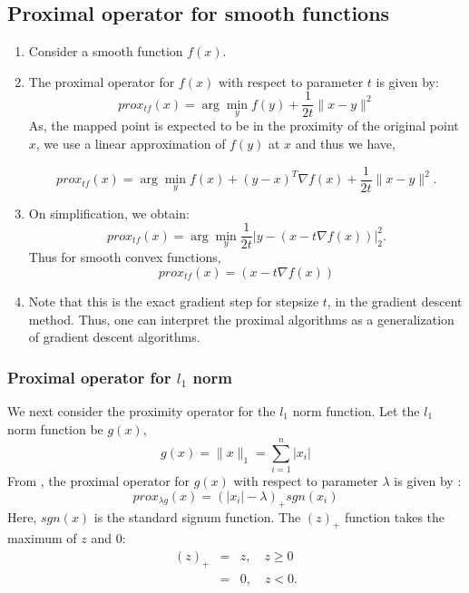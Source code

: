 \subsection{Proximal operator for smooth functions}


\begin{enumerate}
\item Consider a smooth function $f(x)$.
\item The proximal operator for $f(x)$ with respect to parameter $t$ is given by:
\begin{equation}
 prox_{t f}(x) = \arg \min_y  f(y) + \frac{1}{2t} \|x-y\|^2 
\end{equation}
As, the mapped point is expected to be in the proximity of the original point $x$, we use a linear approximation of $f(y)$ at $x$  and thus we have,

\begin{equation}
 prox_{t f}(x) = \arg \min_y f(x) + (y-x)^T \nabla f(x)  + \frac{1}{2t} \|x-y\|^2 .
\end{equation}
\item On simplification, we obtain:
\begin{equation}
 prox_{t f}(x) = \arg \min_y \frac{1}{2t} \left| y -  \left( x - t \nabla f(x) \right)  \right|^2_2.
\end{equation}
Thus for smooth convex functions, 
\begin{equation}
 prox_{t f}(x) = \left( x - t \nabla f(x) \right)
 \label{eq:prox}
\end{equation}
\item Note that this is the exact gradient step for stepsize $t$, in the gradient descent method.
Thus, one can interpret the proximal algorithms as a generalization of gradient descent algorithms.
\end{enumerate}

\subsubsection{Proximal operator for $l_1$ norm}
We next consider the proximity operator for the $l_1$ norm function. 
Let the $l_1$ norm function be $g(x)$,
\begin{equation}
 g(x) = \| x \|_1 = \sum_{i=1}^n |x_i|
\end{equation}
From \cite{prox_book}, the proximal operator for $g(x)$ with respect to parameter $\lambda$ is given by :
\begin{equation}
 prox_{\lambda g}(x) = (|x_i| - \lambda)_+ sgn(x_i)
\end{equation}
Here, $sgn(x)$ is the standard signum function. 
The $(z)_+$ function takes the maximum of $z$ and 0:
\begin{eqnarray}
 (z)_+ &=& z, \quad z \geq 0 \\
       &=& 0,  \quad z < 0.
\end{eqnarray}




